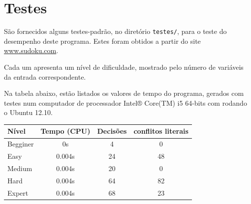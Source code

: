 \documentclass[a4paper]{article}
\begin{document}
\newpage %

\section{Testes}
\label{sec:testes}

  São fornecidos alguns testes-padrão, no diretório \texttt{testes/}, para
  o teste do desempenho deste programa. Estes foram obtidos a partir do
  site \url{www.sudoku.com}.
  
  Cada um apresenta um nível de dificuldade, mostrado pelo número de 
  variáveis da entrada correspondente.
  
  Na tabela abaixo, estão listados os valores de tempo do programa, gerados
  com testes num computador de processador Intel® Core(TM) i5 64-bits com
  rodando o Ubuntu 12.10.
  
  \bigskip
  \begin{center}
  \begin{tabular}{l|c|c|c}
    Nível    & Tempo (CPU) & Decisões & conflitos literais \\ \hline
    Begginer &     0s      &     4    &         0          \\ \hline
    Easy     &   0.004s    &    24    &        48          \\ \hline
    Medium   &   0.004s    &    20    &         0          \\ \hline
    Hard     &   0.004s    &    64    &        82          \\ \hline     
    Expert   &   0.004s    &    68    &        23          \\
    
  \end{tabular}
  \end{center}
\end{document}
